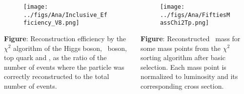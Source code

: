 \begin{frame}{}
\vspace{-.2cm}

\begin{columns}
\begin{column}{.50\textwidth}

\begin{figure}[!Hhtbp]
  \begin{center}
    \texttt{[image: ../figs/Ana/Inclusive\_Efficiency\_V8.png]}
  \end{center}
\end{figure}

\vspace{-.2cm}
\begin{block}{}
\scriptsize \textbf{Figure}: Reconstruction efficiency by the $\chi^{2}$ algorithm of the Higgs boson, \W~boson, top quark and \Tp, as the ratio of the number of events where the particle was correctly reconstructed to the total number of events.
\end{block}
\end{column}

\begin{column}{.50\textwidth}

\begin{figure}[!Hhtbp]
  \begin{center}
    \texttt{[image: ../figs/Ana/FiftiesMassChi2Tp.png]}
  \end{center}
\end{figure}

\vspace{-.2cm}
\begin{block}{}
\scriptsize \textbf{Figure}: Reconstructed \Tp~mass for some mass points from the $\chi^{2}$ sorting algorithm after basic selection. Each mass point is normalized to luminosity and its corresponding cross section.
\end{block}
\end{column}

\end{columns}
\end{frame}

